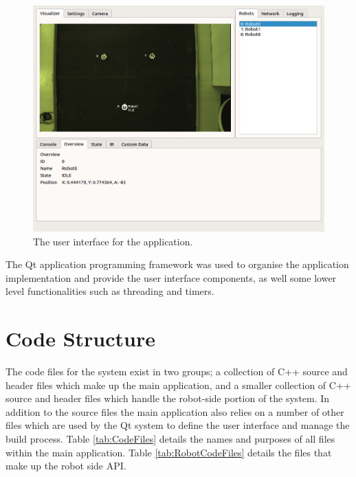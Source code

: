 \begin{figure}
	\centering
	\includegraphics[scale=0.4]{Figures/ApplicationScreenshotOverview.png}
	\decoRule
	\caption[Application User Interface]{The user interface for the application.}
	\label{fig:UI}
\end{figure}

The Qt application programming framework was used to organise the application implementation and provide the user interface components, as well some lower level functionalities such as threading and timers.


\section{Code Structure}
The code files for the system exist in two groups; a collection of C++ source and header files which make up the main application, and a smaller collection of C++ source and header files which handle the robot-side portion of the system. In addition to the source files the main application also relies on a number of other files which are used by the Qt system to define the user interface and manage the build process. Table \ref{tab:CodeFiles} details the names and purposes of all files within the main application. Table \ref{tab:RobotCodeFiles} details the files that make up the robot side API.

